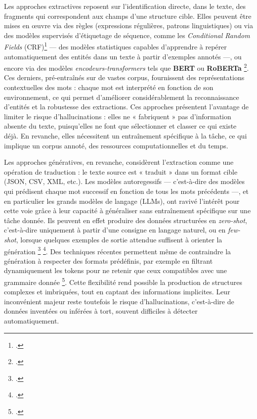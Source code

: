 Les approches extractives reposent sur l’identification directe, dans le texte, des fragments qui correspondent aux champs d’une structure cible. Elles peuvent être mises en œuvre via des règles (expressions régulières, patrons linguistiques) ou via des modèles supervisés d’étiquetage de séquence, comme les \emph{Conditional Random Fields} (CRF)\footcite[][]{finkel} — des modèles statistiques capables d’apprendre à repérer automatiquement des entités dans un texte à partir d’exemples annotés —, ou encore via des modèles \emph{encodeurs-transformers} tels que \textbf{BERT} ou \textbf{RoBERTa} \footcite[][]{devlin}. Ces derniers, pré-entraînés sur de vastes corpus, fournissent des représentations contextuelles des mots : chaque mot est interprété en fonction de son environnement, ce qui permet d’améliorer considérablement la reconnaissance d’entités et la robustesse des extractions. Ces approches présentent l’avantage de limiter le risque d’hallucinations : elles ne « fabriquent » pas d’information absente du texte, puisqu’elles ne font que sélectionner et classer ce qui existe déjà. En revanche, elles nécessitent un entraînement spécifique à la tâche, ce qui implique un corpus annoté, des ressources computationnelles et du temps.

Les approches génératives, en revanche, considèrent l’extraction comme une opération de traduction : le texte source est « traduit » dans un format cible (JSON, CSV, XML, etc.). Les modèles autoregessifs — c’est-à-dire des modèles qui prédisent chaque mot successif en fonction de tous les mots précédents —, et en particulier les grands modèles de langage (LLMs), ont ravivé l’intérêt pour cette voie grâce à leur capacité à généraliser sans entraînement spécifique sur une tâche donnée. Ils peuvent en effet produire des données structurées en \emph{zero-shot}, c’est-à-dire uniquement à partir d’une consigne en langage naturel, ou en \emph{few-shot}, lorsque quelques exemples de sortie attendue suffisent à orienter la génération \footcite[][]{brown} \footcite[][]{radford}. Des techniques récentes permettent même de contraindre la génération à respecter des formats prédéfinis, par exemple en filtrant dynamiquement les tokens pour ne retenir que ceux compatibles avec une grammaire donnée \footcite[][]{wei}. Cette flexibilité rend possible la production de structures complexes et imbriquées, tout en captant des informations implicites. Leur inconvénient majeur reste toutefois le risque d’hallucinations, c’est-à-dire de données inventées ou inférées à tort, souvent difficiles à détecter automatiquement.


